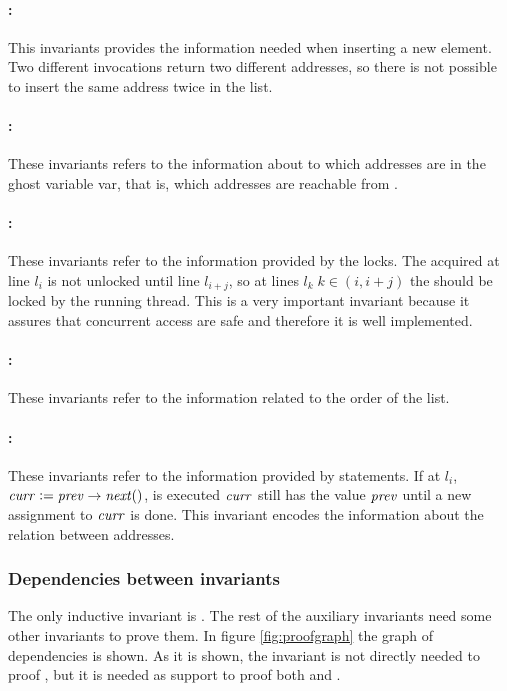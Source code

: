 \paragraph{\invDisjoint:}
This invariants provides the information needed when inserting a new element.
%
Two different \fMalloc invocations return two different addresses, so there is not possible to insert the same address twice in the list.
%
\paragraph{\invRegion:}
These invariants refers to the information about to which addresses are in the ghost variable \region var, that is, which addresses are reachable from \head.
%
\paragraph{\invLock:}
These invariants refer to the information provided by the locks. 
%
The \fLock acquired at line $l_i$ is not unlocked until line $l_{i+j}$, so at lines $l_{k}\; k\in(i,i+j)$ the \fLock should be locked by the running thread.
%
This is a very important invariant because it assures that concurrent access are safe and therefore it is well implemented.
%
\paragraph{\invOrder:}
These invariants refer to the information related to the order of the list. 
%
\paragraph{\invNext:}
These invariants refer to the information provided by \fNext statements. 
%
If at $l_i$, $\mathit{curr} := \mathit{prev}\to\mathit{next}()$, is executed $\mathit{curr}$ still has the value $\mathit{prev}$ until a new assignment to $\mathit{curr}$ is done.
%
This invariant encodes the information about the relation between addresses.

\subsubsection{Dependencies between invariants}
The only inductive invariant is \invOrder. 
%
The rest of the auxiliary invariants need some other invariants to prove them.
%
In figure \ref{fig:proofgraph} the graph of dependencies is shown.
%
As it is shown, the invariant \invDisjoint is not directly needed to proof \invPreserve, but it is needed as support to proof both \invNext and \invRegion. 

